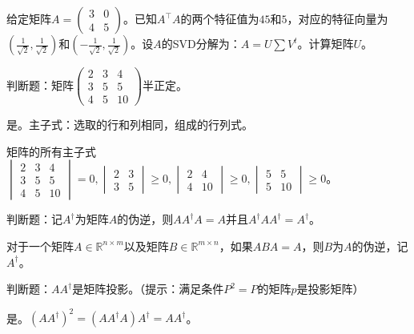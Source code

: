 \begin{problem}
	给定矩阵$A=\begin{pmatrix}
		3&0\\4&5
	\end{pmatrix}$。已知$A^\top A$的两个特征值为$45$和$5$，对应的特征向量为$(\frac{1}{\sqrt{2}},\frac{1}{\sqrt{2}})$和$(-\frac{1}{\sqrt{2}},\frac{1}{\sqrt{2}})$。设$A$的SVD分解为：$A=U\sum V^t$。计算矩阵$U$。
\end{problem}
\begin{solution}
	
\end{solution}


\begin{problem}
	判断题：矩阵$\begin{pmatrix}
		2&3&4\\3&5&5\\4&5&10
	\end{pmatrix}$半正定。
\end{problem}
\begin{solution}	
	是。主子式：选取的行和列相同，组成的行列式。

	矩阵的所有主子式 $\begin{vmatrix}
		2 & 3 & 4 \\
		3 & 5 & 5 \\
		4 & 5 & 10 
	\end{vmatrix} = 0,\begin{vmatrix}
		2 & 3 \\
		3 & 5
	\end{vmatrix} \ge 0, \begin{vmatrix}
		2 & 4 \\ 
		4 & 10
	\end{vmatrix} \ge 0, \begin{vmatrix}
		5 & 5 \\
		5 & 10
	\end{vmatrix} \ge 0$。
\end{solution}


\begin{problem}
	判断题：记$A^{\dagger}$为矩阵$A$的伪逆，则$AA^\dagger A=A$并且$A^\dagger AA^\dagger=A^\dagger$。
\end{problem}
\begin{solution}
	对于一个矩阵$A\in\mathbb{R}^{n\times m}$以及矩阵$B\in\mathbb{R}^{m\times n}$，如果$ABA=A$，则$B$为$A$的伪逆，记$A^\dagger$。
\end{solution}


\begin{problem}
	判断题：$AA^\dagger$是矩阵投影。（提示：满足条件$P^2=P$的矩阵$p$是投影矩阵）
\end{problem}
\begin{solution}
	是。$(AA^\dagger)^2 = (AA^\dagger A) A^\dagger = AA^\dagger$。
\end{solution}




